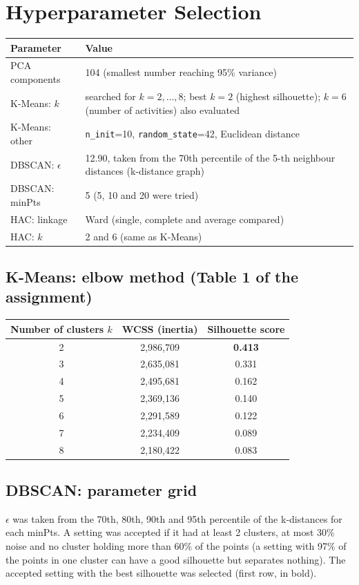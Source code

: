 \documentclass[12pt,a4paper]{article}
\begin{document}
\section{Hyperparameter Selection}\label{sec:hyper}

\begin{tabular}{lp{10.5cm}}
\toprule
Parameter & Value\\
\midrule
PCA components & 104 (smallest number reaching 95\% variance) \\
K-Means: $k$ & searched for $k=2,\dots,8$; best $k=2$ (highest silhouette); $k=6$ (number of activities) also evaluated \\
K-Means: other & \texttt{n\_init}=10, \texttt{random\_state}=42, Euclidean distance \\
DBSCAN: $\epsilon$ & 12.90, taken from the 70th percentile of the 5-th neighbour distances (k-distance graph) \\
DBSCAN: minPts & 5 (5, 10 and 20 were tried) \\
HAC: linkage & Ward (single, complete and average compared) \\
HAC: $k$ & 2 and 6 (same as K-Means) \\
\bottomrule
\end{tabular}

\subsection*{K-Means: elbow method (Table 1 of the assignment)}
\begin{center}
\small
\begin{tabular}{ccc}
\toprule
Number of clusters $k$ & WCSS (inertia) & Silhouette score \\
\midrule
2 & 2,986,709 & \textbf{0.413} \\
3 & 2,635,081 & 0.331 \\
4 & 2,495,681 & 0.162 \\
5 & 2,369,136 & 0.140 \\
6 & 2,291,589 & 0.122 \\
7 & 2,234,409 & 0.089 \\
8 & 2,180,422 & 0.083 \\
\bottomrule
\end{tabular}
\end{center}

\subsection*{DBSCAN: parameter grid}
$\epsilon$ was taken from the 70th, 80th, 90th and 95th percentile of the k-distances for each minPts. A setting was accepted if it had at least 2 clusters, at most 30\% noise and no cluster holding more than 60\% of the points (a setting with 97\% of the points in one cluster can have a good silhouette but separates nothing). The accepted setting with the best silhouette was selected (first row, in bold).
\end{document}

